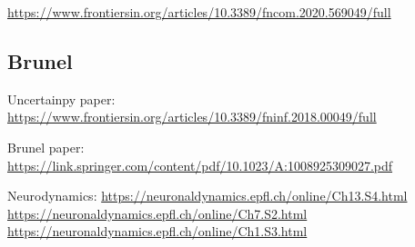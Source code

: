 \url{https://www.frontiersin.org/articles/10.3389/fncom.2020.569049/full}

\subsection{Brunel}

Uncertainpy paper:
\url{https://www.frontiersin.org/articles/10.3389/fninf.2018.00049/full}

Brunel paper: 
\url{https://link.springer.com/content/pdf/10.1023/A:1008925309027.pdf} 

Neurodynamics: 
\url{https://neuronaldynamics.epfl.ch/online/Ch13.S4.html}
\url{https://neuronaldynamics.epfl.ch/online/Ch7.S2.html}
\url{https://neuronaldynamics.epfl.ch/online/Ch1.S3.html}